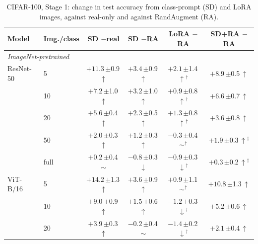 \begin{table}[htbp]
\centering
\footnotesize
\setlength{\tabcolsep}{4pt}
\caption{CIFAR-100, Stage 1: change in test accuracy from class-prompt (SD) and LoRA images, against real-only and against RandAugment (RA).}
\label{tab:paper-stage1}
\begin{tabular}{llcccc}
\toprule
Model & Img./class & \shortstack{SD\\$-$real} & \shortstack{SD\\$-$RA} & \shortstack{LoRA\\$-$RA} & \shortstack{SD+RA\\$-$RA} \\
\midrule
\multicolumn{6}{l}{\textit{ImageNet-pretrained}} \\
ResNet-50 & 5 & $+11.3$\,{\scriptsize$\pm$0.9}\,$\uparrow$ & $+3.4$\,{\scriptsize$\pm$0.9}\,$\uparrow$ & $+2.1$\,{\scriptsize$\pm$1.4}\,$\uparrow$$^\dagger$ & $+8.9$\,{\scriptsize$\pm$0.5}\,$\uparrow$ \\
 & 10 & $+7.2$\,{\scriptsize$\pm$1.0}\,$\uparrow$ & $+3.2$\,{\scriptsize$\pm$1.0}\,$\uparrow$ & $+0.9$\,{\scriptsize$\pm$0.8}\,$\uparrow$$^\dagger$ & $+6.6$\,{\scriptsize$\pm$0.7}\,$\uparrow$ \\
 & 20 & $+5.6$\,{\scriptsize$\pm$0.4}\,$\uparrow$ & $+2.3$\,{\scriptsize$\pm$0.5}\,$\uparrow$ & $+1.3$\,{\scriptsize$\pm$0.8}\,$\uparrow$$^\dagger$ & $+3.6$\,{\scriptsize$\pm$0.8}\,$\uparrow$ \\
 & 50 & $+2.0$\,{\scriptsize$\pm$0.3}\,$\uparrow$ & $+1.2$\,{\scriptsize$\pm$0.3}\,$\uparrow$ & $-0.3$\,{\scriptsize$\pm$0.4}\,$\sim$$^\dagger$ & $+1.9$\,{\scriptsize$\pm$0.3}\,$\uparrow$$^\dagger$ \\
 & full & $+0.2$\,{\scriptsize$\pm$0.4}\,$\sim$ & $-0.8$\,{\scriptsize$\pm$0.3}\,$\downarrow$ & $-0.9$\,{\scriptsize$\pm$0.3}\,$\downarrow$$^\dagger$ & $+0.3$\,{\scriptsize$\pm$0.2}\,$\uparrow$$^\dagger$ \\
\addlinespace[2pt]
ViT-B/16 & 5 & $+14.2$\,{\scriptsize$\pm$1.3}\,$\uparrow$ & $+3.6$\,{\scriptsize$\pm$0.9}\,$\uparrow$ & $+0.9$\,{\scriptsize$\pm$1.1}\,$\sim$$^\dagger$ & $+10.8$\,{\scriptsize$\pm$1.3}\,$\uparrow$ \\
 & 10 & $+9.0$\,{\scriptsize$\pm$0.9}\,$\uparrow$ & $+1.5$\,{\scriptsize$\pm$0.6}\,$\uparrow$ & $-1.2$\,{\scriptsize$\pm$0.3}\,$\downarrow$$^\dagger$ & $+5.2$\,{\scriptsize$\pm$0.6}\,$\uparrow$ \\
 & 20 & $+3.9$\,{\scriptsize$\pm$0.3}\,$\uparrow$ & $-0.2$\,{\scriptsize$\pm$0.4}\,$\sim$ & $-1.4$\,{\scriptsize$\pm$0.2}\,$\downarrow$$^\dagger$ & $+2.1$\,{\scriptsize$\pm$0.4}\,$\uparrow$ \\

\end{tabular}
\end{table}
